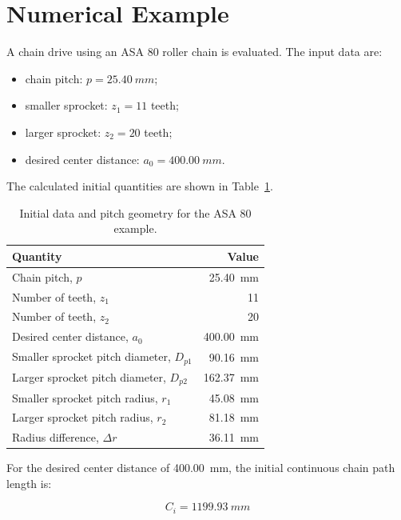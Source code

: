 \documentclass[11pt,a4paper]{article}
\begin{document}
\section{Numerical Example}

A chain drive using an ASA 80 roller chain is evaluated. The input data are:

\begin{itemize}
    \item chain pitch: $p = \SI{25.40}{mm}$;
    \item smaller sprocket: $z_1 = 11$ teeth;
    \item larger sprocket: $z_2 = 20$ teeth;
    \item desired center distance: $a_0 = \SI{400.00}{mm}$.
\end{itemize}

The calculated initial quantities are shown in Table~\ref{tab:initial-data}.

\begin{table}[H]
\centering
\caption{Initial data and pitch geometry for the ASA 80 example.}
\label{tab:initial-data}
\begin{tabular}{lr}
\toprule
Quantity & Value \\
\midrule
Chain pitch, $p$ & \SI{25.40}{mm} \\
Number of teeth, $z_1$ & 11 \\
Number of teeth, $z_2$ & 20 \\
Desired center distance, $a_0$ & \SI{400.00}{mm} \\
Smaller sprocket pitch diameter, $D_{p1}$ & \SI{90.16}{mm} \\
Larger sprocket pitch diameter, $D_{p2}$ & \SI{162.37}{mm} \\
Smaller sprocket pitch radius, $r_1$ & \SI{45.08}{mm} \\
Larger sprocket pitch radius, $r_2$ & \SI{81.18}{mm} \\
Radius difference, $\Delta r$ & \SI{36.11}{mm} \\
\bottomrule
\end{tabular}
\end{table}

For the desired center distance of \SI{400.00}{mm}, the initial continuous chain path length is:

\begin{equation}
    C_i = \SI{1199.93}{mm}
\end{equation}
\end{document}
